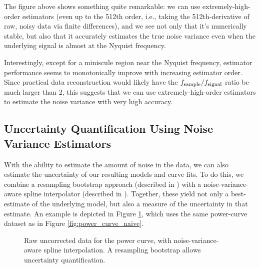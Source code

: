 \documentclass[conf]{new-aiaa}
\begin{document}
    The figure above shows something quite remarkable: we can use extremely-high-order estimators (even up to the 512th order, i.e., taking the 512th-derivative of raw, noisy data via finite differences), and we see not only that it's numerically stable, but also that it accurately estimates the true noise variance even when the underlying signal is almost at the Nyquist frequency.

    Interestingly, except for a miniscule region near the Nyquist frequency, estimator performance seems to monotonically improve with increasing estimator order. Since practical data reconstruction would likely have the $f_{\rm sample} / f_{\rm signal}$ ratio be much larger than 2, this suggests that we can use extremely-high-order estimators to estimate the noise variance with very high accuracy.

    \subsection{Uncertainty Quantification Using Noise Variance Estimators}

    With the ability to estimate the amount of noise in the data, we can also estimate the uncertainty of our resulting models and curve fits. To do this, we combine a resampling bootstrap approach (described in \cite{elements_of_statistical_learning}) with a noise-variance-aware spline interpolator (described in \cite{wahba}). Together, these yield not only a best-estimate of the underlying model, but also a measure of the uncertainty in that estimate. An example is depicted in Figure \ref{fig:power_curve_spline_but_no_physics}, which uses the same power-curve dataset as in Figure \ref{fig:power_curve_naive}.

    \begin{figure}[!htb]
        \centering
        \caption{Raw uncorrected data for the power curve, with noise-variance-aware spline interpolation. A resampling bootstrap allows uncertainty quantification.}
        \label{fig:power_curve_spline_but_no_physics}
    \end{figure}
\end{document}
